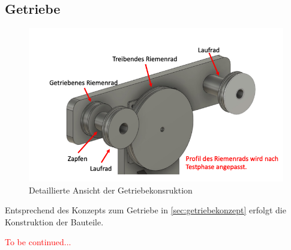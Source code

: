 \subsection{Getriebe}
\begin{figure}[h]
	\begin{center}
		\includegraphics[width=17cm]{getriebe.png}
		\caption{Detaillierte Ansicht der Getriebekonsruktion}
		\label{pic:getriebe}
	\end{center}
\end{figure}

Entsprechend des Konzepts zum Getriebe in \autoref{sec:getriebekonzept} erfolgt die Konstruktion der Bauteile.   

\textcolor{red}{To be continued...}

	